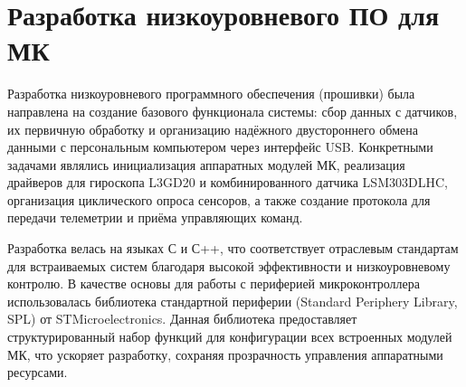 \section{Разработка низкоуровневого ПО для МК}
\label{sec:firmware}

Разработка низкоуровневого программного обеспечения (прошивки) была направлена на создание базового функционала системы: сбор данных с датчиков, их первичную обработку и организацию надёжного двустороннего обмена данными с персональным компьютером через интерфейс USB. Конкретными задачами являлись инициализация аппаратных модулей МК, реализация драйверов для гироскопа L3GD20 и комбинированного датчика LSM303DLHC, организация циклического опроса сенсоров, а также создание протокола для передачи телеметрии и приёма управляющих команд.

Разработка велась на языках С и С++, что соответствует отраслевым стандартам для встраиваемых систем благодаря высокой эффективности и низкоуровневому контролю. В качестве основы для работы с периферией микроконтроллера использовалась библиотека стандартной периферии (Standard Periphery Library, SPL) от STMicroelectronics. Данная библиотека предоставляет структурированный набор функций для конфигурации всех встроенных модулей МК, что ускоряет разработку, сохраняя прозрачность управления аппаратными ресурсами.